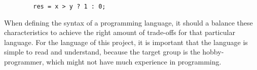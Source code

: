 \begin{code}
	\begin{lstlisting}
		res = x > y ? 1 : 0;
	\end{lstlisting}
\end{code}

When defining the syntax of a programming language, it should a balance these characteristics to achieve the right amount of trade-offs for that particular language. For the language of this project, it is important that the language is simple to read and understand, because the target group is the hobby-programmer, which might not have much experience in programming.